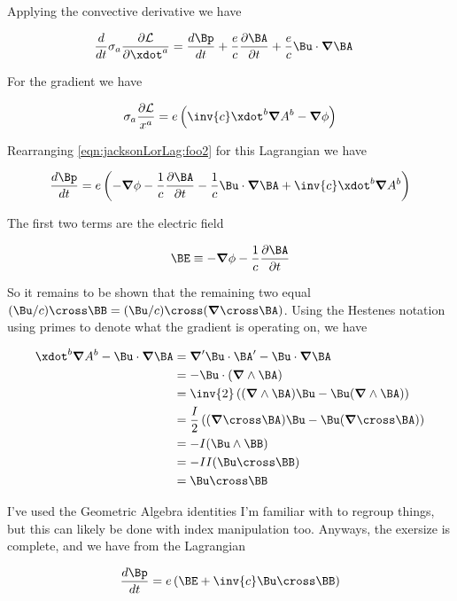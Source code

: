 Applying the convective derivative we have

\begin{align*}
\frac{d}{dt} 
\sigma_a \frac{\partial \LL}{\partial \xdot^a}
&=
\frac{d\Bp}{dt} 
+ \frac{e}{c} \frac{\partial \BA}{\partial t}
+ \frac{e}{c} \Bu \cdot \spacegrad \BA
\end{align*}

For the gradient we have

\begin{align*}
\sigma_a \frac{\partial \LL}{x^a} = e\left( \inv{c}\xdot^b \spacegrad A^b - \spacegrad \phi \right)
\end{align*}

Rearranging \ref{eqn:jacksonLorLag:foo2} for this Lagrangian we have

\begin{align*}
\frac{d\Bp}{dt} 
=
e \left( 
- \spacegrad \phi
- \frac{1}{c} \frac{\partial \BA}{\partial t}
- \frac{1}{c} \Bu \cdot \spacegrad \BA
 +\inv{c} \xdot^b \spacegrad A^b 
\right)
\end{align*}

The first two terms are the electric field

\begin{align*}
\BE \equiv
- \spacegrad \phi
- \frac{1}{c} \frac{\partial \BA}{\partial t}
\end{align*}

So it remains to be shown that the remaining two equal $(\Bu/c) \cross \BB = (\Bu/c) \cross (\spacegrad \cross \BA)$.  Using the Hestenes notation using primes to denote what the gradient is operating on, we have

\begin{align*}
\xdot^b \spacegrad A^b - \Bu \cdot \spacegrad \BA
&=
\spacegrad' \Bu \cdot \BA' - \Bu \cdot \spacegrad \BA \\
&=
-\Bu \cdot (\spacegrad \wedge \BA) \\
&=
\inv{2} \left(
(\spacegrad \wedge \BA) \Bu  -
\Bu (\spacegrad \wedge \BA) 
\right) \\
&=
\frac{I}{2} \left(
(\spacegrad \cross \BA) \Bu -
\Bu (\spacegrad \cross \BA) 
\right) \\
&=
-I (\Bu \wedge \BB) \\
&=
-I I (\Bu \cross \BB) \\
&=
\Bu \cross \BB \\
\end{align*}

I've used the Geometric Algebra identities I'm familiar with to regroup things, but this can likely be done with index manipulation too.  Anyways, the exersize is complete, and we have from the Lagrangian

\begin{align}\label{eqn:jacksonLorLag:foo3}
\frac{d\Bp}{dt} = e \left( \BE + \inv{c} \Bu \cross \BB \right)
\end{align}

\EndArticle
